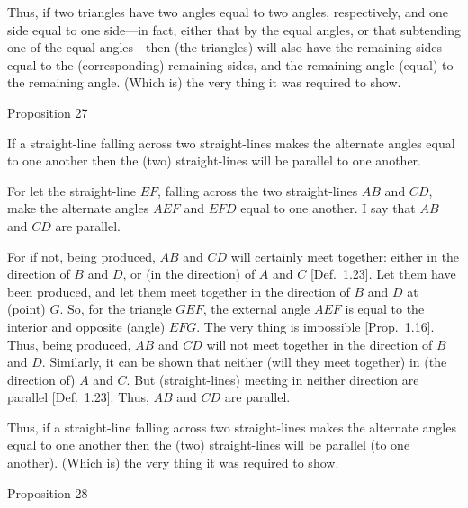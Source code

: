 Thus, if two triangles have two angles equal to two angles, respectively, 
and one side equal to one side---in fact, either that by the equal angles, or that
subtending one of the equal angles---then (the triangles) will also have the remaining sides equal to the (corresponding) remaining sides, and the
remaining angle (equal) to the remaining angle. (Which is) the very thing it
was required to show.


\begin{center}
{\large Proposition 27}
\end{center}

If a straight-line falling across two straight-lines makes  the alternate
angles equal to one another then the (two) straight-lines will be parallel to
one another.

\epsfysize=1.5in
\centerline{}

For let the straight-line $EF$, falling across the two straight-lines $AB$ and
$CD$, make the alternate angles $AEF$ and $EFD$ equal to one another.
I say that $AB$ and $CD$ are parallel.

For if not, being produced, $AB$ and $CD$ will certainly meet together:
either in the direction of $B$ and $D$, or (in the
direction) of $A$ and $C$ [Def.~1.23]. Let them have been
produced, and let them meet together in the direction of $B$ and $D$ at
 (point) $G$. So, for the triangle $GEF$, the external angle
$AEF$ is equal to the interior and opposite (angle) $EFG$. The
very thing is impossible [Prop.~1.16]. Thus, being produced, $AB$ and $CD$
will not meet together in the direction of $B$ and $D$. Similarly, 
it can be shown that neither (will they meet together) in (the
direction of) $A$ and $C$. But  (straight-lines) meeting in neither
direction are parallel [Def.~1.23]. Thus, $AB$ and $CD$ are parallel.

Thus, if a straight-line falling across two straight-lines makes  the alternate
angles equal to one another then the (two) straight-lines will be parallel (to
one another). (Which is) the very thing it was required to show.


\begin{center}
{\large Proposition 28}
\end{center}

